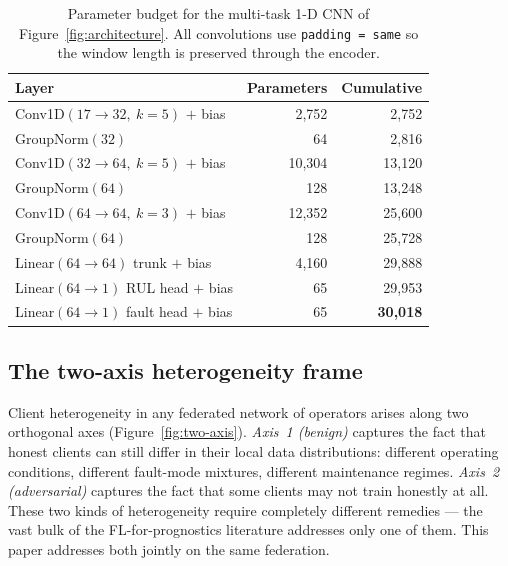 \documentclass[a4paper,fleqn,doubleblind]{cas-sc}
\newcommand{\tblhead}{\rowcolor{tblHeadBg}}
\newcommand{\zebra}{\rowcolors{2}{tblAltBg}{white}}
\newcommand{\tblhead}{}
\newcommand{\zebra}{}
\begin{document}
\begin{table}[pos=tbp]
\centering
\footnotesize
\setlength{\tabcolsep}{6pt}
\renewcommand{\arraystretch}{1.1}
\caption{Parameter budget for the multi-task 1-D CNN of Figure~\ref{fig:architecture}. All convolutions use \texttt{padding = same} so the window length is preserved through the encoder.}
\label{tab:params}
\zebra
\begin{tabular}{@{}l r r@{}}
\toprule
\tblhead
Layer & Parameters & Cumulative \\
\midrule
Conv1D$(17 \to 32,\ k{=}5)$ $+$ bias & 2{,}752 & 2{,}752 \\
GroupNorm$(32)$                       & 64      & 2{,}816 \\
Conv1D$(32 \to 64,\ k{=}5)$ $+$ bias & 10{,}304 & 13{,}120 \\
GroupNorm$(64)$                       & 128     & 13{,}248 \\
Conv1D$(64 \to 64,\ k{=}3)$ $+$ bias & 12{,}352 & 25{,}600 \\
GroupNorm$(64)$                       & 128     & 25{,}728 \\
Linear$(64 \to 64)$ trunk $+$ bias   & 4{,}160  & 29{,}888 \\
Linear$(64 \to 1)$ RUL head $+$ bias & 65       & 29{,}953 \\
Linear$(64 \to 1)$ fault head $+$ bias & 65     & \textbf{30{,}018} \\
\bottomrule
\end{tabular}
\end{table}

\subsection{The two-axis heterogeneity frame}
\label{subsec:two-axis-frame}

Client heterogeneity in any federated network of operators arises
along two orthogonal axes (Figure~\ref{fig:two-axis}).
\emph{Axis~1 (benign)} captures the fact that honest clients can
still differ in their local data distributions: different operating
conditions, different fault-mode mixtures, different maintenance
regimes. \emph{Axis~2 (adversarial)} captures the fact that some
clients may not train honestly at all. These two kinds of heterogeneity require
completely different remedies --- the vast bulk of the
FL-for-prognostics literature addresses only one of them. This paper
addresses both jointly on the same federation.
\end{document}

